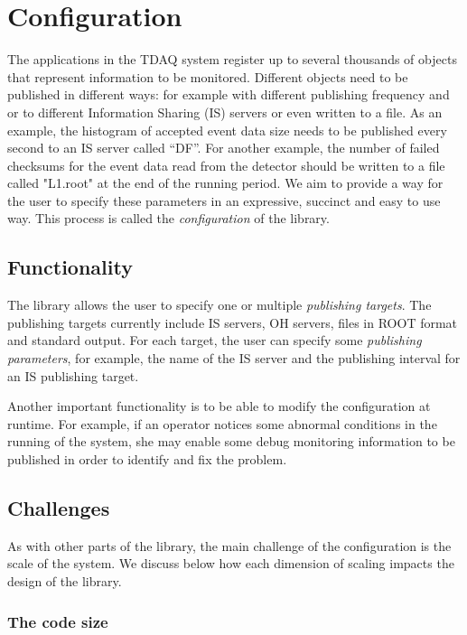 \chapter{Configuration} %
\label{Capitolul3}

The applications in the TDAQ system register up to several thousands of objects that represent information to be monitored. Different objects need to be published in different ways: for example with different publishing frequency and or to different Information Sharing (IS) servers \citep{kolosinformation} or even written to a file. As an example, the histogram of accepted event data size needs to be published every second to an IS server called “DF”. For another example, the number of failed checksums for the event data read from the detector should be written to a file called "L1.root" at the end of the running period. We aim to provide a way for the user to specify these parameters in an expressive, succinct and easy to use way. This process is called the \emph{configuration} of the library.

\section*{Functionality}

The library allows the user to specify one or multiple \emph{publishing targets}. The publishing targets currently include IS servers, OH servers, files in ROOT \citep{brun1997root} format and standard output. For each target, the user can specify some \emph{publishing parameters}, for example, the name of the IS server and the publishing interval for an IS publishing target.

Another important functionality is to be able to modify the configuration at runtime. For example, if an operator notices some abnormal conditions in the running of the system, she may enable some debug monitoring information to be published in order to identify and fix the problem. 

\section*{Challenges}

As with other parts of the library, the main challenge of the configuration is the scale of the system. We discuss below how each dimension of scaling impacts the design of the library.

\subsection*{The code size}

